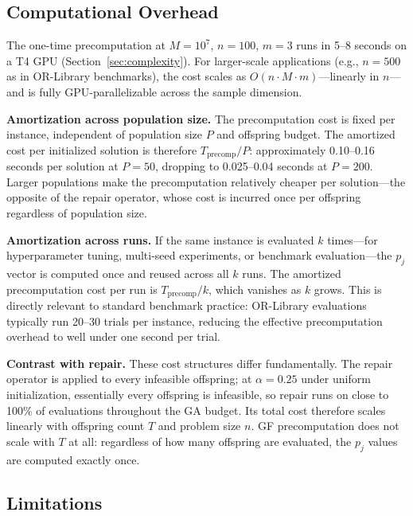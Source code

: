 \documentclass[twocolumn]{article}
\begin{document}
\subsection{Computational Overhead}

The one-time precomputation at $M = 10^7$, $n = 100$, $m = 3$ runs in 
5--8 seconds on a T4 GPU (Section~\ref{sec:complexity}). For larger-scale 
applications (e.g., $n = 500$ as in OR-Library benchmarks), the cost 
scales as $O(n \cdot M \cdot m)$---linearly in $n$---and is fully 
GPU-parallelizable across the sample dimension.

\noindent \textbf{Amortization across population size.}
The precomputation cost is fixed per instance, independent of population 
size $P$ and offspring budget. The amortized cost per initialized 
solution is therefore $T_{\text{precomp}} / P$: approximately 0.10--0.16 
seconds per solution at $P = 50$, dropping to 0.025--0.04 seconds at 
$P = 200$. Larger populations make the precomputation relatively cheaper 
per solution---the opposite of the repair operator, whose cost is 
incurred once per offspring regardless of population size.

\noindent \textbf{Amortization across runs.}
If the same instance is evaluated $k$ times---for hyperparameter tuning, 
multi-seed experiments, or benchmark evaluation---the $p_j$ vector is 
computed once and reused across all $k$ runs. The amortized precomputation 
cost per run is $T_{\text{precomp}} / k$, which vanishes as $k$ grows. 
This is directly relevant to standard benchmark practice: OR-Library 
evaluations typically run 20--30 trials per instance, reducing the 
effective precomputation overhead to well under one second per trial.

\noindent \textbf{Contrast with repair.}
These cost structures differ fundamentally. The repair operator is applied 
to every infeasible offspring; at $\alpha = 0.25$ under uniform 
initialization, essentially every offspring is infeasible, so repair 
runs on close to 100\% of evaluations throughout the GA budget. Its 
total cost therefore scales linearly with offspring count $T$ and 
problem size $n$. GF precomputation does not scale with $T$ at all: 
regardless of how many offspring are evaluated, the $p_j$ values are 
computed exactly once.

\subsection{Limitations}
\end{document}
